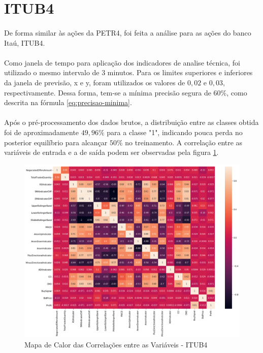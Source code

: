 \documentclass[grad,numbers]{coppe}
\begin{document}
    \section{ITUB4}
    
        \paragraph{}De forma similar às ações da PETR4, foi feita a análise para as ações do banco Itaú, ITUB4.
        
        \paragraph{}Como janela de tempo para aplicação dos indicadores de analise técnica, foi utilizado o mesmo intervalo de 3 minutos. Para os limites superiores e inferiores da janela de previsão, x e y, foram utilizados os valores de $0,02$ e $0,03$, respectivamente. Dessa forma, tem-se a mínima precisão segura de $60\%$, como descrita na fórmula \ref{eq:precisao-minima}.
        
        \paragraph{}Após o pré-processamento dos dados brutos, a distribuição entre as classes obtida foi de aproximadamente $49,96\%$ para a classe "1", indicando pouca perda no posterior equilíbrio para alcançar $50\%$ no treinamento. A correlação entre as variáveis de entrada e a de saída podem ser observadas pela figura \ref{img:corr-itub4}.
        
        \begin{figure}[h]
                \caption{Mapa de Calor das Correlações entre as Variáveis - ITUB4}
                \label{img:corr-itub4} \includegraphics[width=15cm]{corr-itub4.png}
                \centering
            \end{figure}
        
\end{document}
